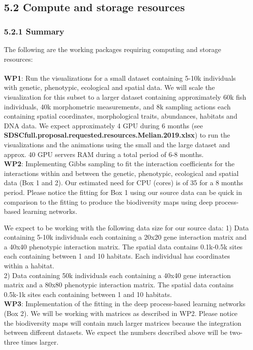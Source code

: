 \documentclass[11pt]{article}
\begin{document}
\subsection*{5.2 Compute and storage resources}

\subsubsection*{5.2.1 Summary}
The following are the working packages requiring computing and storage resources:\\
\\
{\bf WP1}: Run the visualizations for a small dataset containing 5-10k
individuals with genetic, phenotypic, ecological and spatial data. We
will scale the visualization for this subset to a larger dataset
containing approximately 60k fish individuals, 40k morphometric
measurements, and 8k sampling actions each containing spatial
coordinates, morphological traits, abundances, habitats and DNA
data. We expect approximately 4 GPU during 6 months (see {\bf
  SDSC{full}.{proposal}.{requested}.{resources}.{Melian}.{2019}.xlsx})
to run the visualizations and the animations using the small and the
large dataset and approx. 40 GPU servers RAM during a total period of
6-8 months.\\
{\bf WP2}: Implementing Gibbs sampling to fit the interaction
coefficients for the interactions within and between the genetic,
phenotypic, ecological and spatial data (Box 1 and 2). Our estimated
need for CPU (cores) is of 35 for a 8 months period. Please notice the
fitting for Box 1 using our source data can be quick in comparison to
the fitting to produce the biodiversity maps using deep process-based
learning networks.

We expect to be working with the following data size for our source data:
1) Data containing 5-10k individuals each containing a 20x20 gene
interaction matrix and a 40x40 phenotypic interaction matrix. The
spatial data contains 0.1k-0.5k sites each containing between 1 and 10
habitats. Each individual has coordinates within a habitat.\\
2) Data containing 50k individuals each containing a 40x40 gene
interaction matrix and a 80x80 phenotypic interaction matrix. The
spatial data contains 0.5k-1k sites each containing between 1 and 10
habitats.\\
{\bf WP3}: Implementation of the fitting in the deep process-based
learning networks (Box 2). We will be working with matrices as
described in WP2. Please notice the biodiversity maps will contain
much larger matrices because the integration between different
datasets. We expect the numbers described above will be two-three
times larger. 
\end{document}
